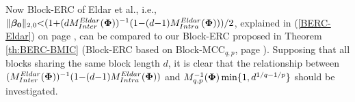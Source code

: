 %
Now Block-ERC of Eldar et al., i.e., $\Vert \boldsymbol{\beta_0} \Vert_{2,0} {<} (1 {+} (d M^{Eldar}_{Inter}(\boldsymbol{\Phi}))^{-1} (1 {-} (d {-} 1)M^{Eldar}_{Intra}(\boldsymbol{\Phi})))/2$, explained in (\ref{BERC-Eldar}) on page \pageref{BERC-Eldar}, can be compared to our Block-ERC proposed in Theorem \ref{th:BERC-BMIC} (Block-ERC based on Block-MCC$_{q,p}$, page \pageref{th:BERC-BMIC}).
Supposing that all blocks sharing the same block length $d$, it is clear that the relationship between $(M^{Eldar}_{Inter}(\boldsymbol{\Phi}))^{-1} (1 {-} (d {-} 1)M^{Eldar}_{Intra}(\boldsymbol{\Phi}))$ and $M_{q,p}^{-1}(\boldsymbol{\Phi}) \min \{1 , d^{1/q {-} 1/p} \} $ 
should be investigated.
